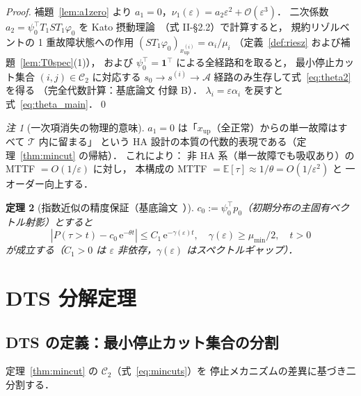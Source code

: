 \documentclass[12pt,a4paper]{article}
\theoremstyle{plain}
\newtheorem{theorem}{定理}[section]
\theoremstyle{definition}
\theoremstyle{remark}
\newtheorem{remark}[theorem]{注}
\newcommand{\bE}{\mathbb{E}}           %
\newcommand{\calO}{\mathcal{O}}        %
\newcommand{\calA}{\mathcal{A}}        %
\newcommand{\calT}{\mathcal{T}}        %
\newcommand{\eps}{\varepsilon}         %
\newcommand{\e}{\mathrm{e}}            %
\newcommand{\RedRes}{S}                %
\newcommand{\calCtwo}{\mathcal{C}_2}   %
\begin{document}
\begin{proof}
  補題~\ref{lem:a1zero} より $a_1=0$，$\nu_1(\eps)=a_2\eps^2+\calO(\eps^3)$．
  二次係数 $a_2 = \psi_0^\top T_1\RedRes T_1\varphi_0$ を
  Kato 摂動理論~\cite{kato1995}（式 II-\S2.2）で計算すると，
  規約リゾルベントの 1 重故障状態への作用
  $(\RedRes T_1\varphi_0)_{x_{\mathrm{up}}^{(i)}} = \alpha_i/\mu_i$
  （定義~\ref{def:riesz} および補題~\ref{lem:T0spec}(1)），
  および $\psi_0^\top = \mathbf{1}^\top$ による全経路和を取ると，
  最小停止カット集合 $(i,j)\in\calCtwo$ に対応する
  $s_0\to s^{(i)}\to\calA$ 経路のみ生存して式~\eqref{eq:theta2} を得る
  （完全代数計算：基底論文 付録 B）．
  $\lambda_i=\eps\alpha_i$ を戻すと式~\eqref{eq:theta_main}．\qed
\end{proof}

\begin{remark}[一次項消失の物理的意味]
  $a_1=0$ は「$x_{\mathrm{up}}$（全正常）からの単一故障はすべて $\calT$ 内に留まる」
  という HA 設計の本質の代数的表現である（定理~\ref{thm:mincut} の帰結）．
  これにより：
  非 HA 系（単一故障でも吸収あり）の MTTF $= O(1/\eps)$ に対し，
  本構成の MTTF $= \bE[\tau] \approx 1/\theta = O(1/\eps^2)$ と
  一オーダー向上する．
\end{remark}

\begin{theorem}[指数近似の精度保証（基底論文~\cite{habase:v7}）]\label{thm:approx}
  $c_0 := \psi_0^\top p_0$（初期分布の主固有ベクトル射影）とすると
  \begin{equation}\label{eq:approx}
    |P(\tau>t) - c_0\,\e^{-\theta t}|
    \le C_1\,\e^{-\gamma(\eps)t},
    \quad \gamma(\eps) \ge \mu_{\min}/2,\quad t>0
  \end{equation}
  が成立する（$C_1>0$ は $\eps$ 非依存，$\gamma(\eps)$ はスペクトルギャップ）．
\end{theorem}

\section{DTS 分解定理}\label{sec:DTS}

\subsection{DTS の定義：最小停止カット集合の分割}

定理~\ref{thm:mincut} の $\calCtwo$（式~\eqref{eq:mincuts}）を
停止メカニズムの差異に基づき二分割する．
\end{document}
